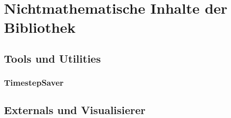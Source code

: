 \chapter{Nichtmathematische Inhalte der Bibliothek}

\section{Tools und Utilities}


\subsection{TimestepSaver}


\section{Externals und Visualisierer}

